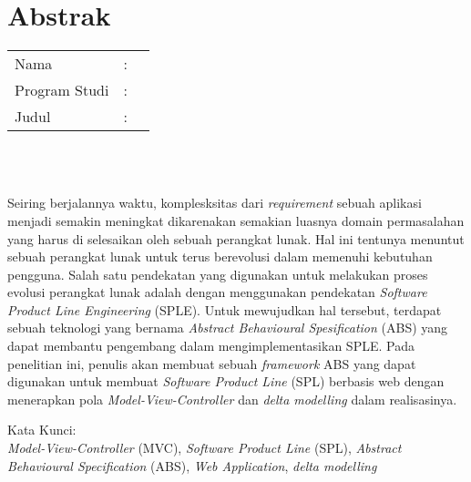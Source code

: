 %
%
%

\chapter*{Abstrak}

\vspace*{0.2cm}

\noindent \begin{tabular}{l l p{10cm}}
	Nama&: & \penulis \\
	Program Studi&: & \program \\
	Judul&: & \judul \\
\end{tabular} \\ 

\vspace*{0.5cm}

\noindent 
\\ Seiring berjalannya waktu, komplesksitas dari \textit{requirement} sebuah aplikasi menjadi semakin meningkat dikarenakan semakian luasnya domain permasalahan yang harus di selesaikan oleh sebuah perangkat lunak. Hal ini tentunya menuntut sebuah perangkat lunak untuk terus berevolusi dalam memenuhi kebutuhan pengguna. Salah satu pendekatan yang digunakan untuk melakukan proses evolusi perangkat lunak adalah dengan menggunakan pendekatan \textit{Software Product Line Engineering} (SPLE). Untuk mewujudkan hal tersebut, terdapat sebuah teknologi yang bernama \textit{Abstract Behavioural Spesification} (ABS) yang dapat membantu pengembang dalam mengimplementasikan SPLE. Pada penelitian ini, penulis akan membuat sebuah \textit{framework} ABS yang dapat digunakan untuk membuat \textit{Software Product Line} (SPL) berbasis web dengan menerapkan pola \textit{Model-View-Controller} dan \textit{delta modelling} dalam realisasinya.

\vspace*{0.2cm}

\noindent Kata Kunci: \\ 
\noindent \textit{Model-View-Controller} (MVC), \textit{Software Product Line} (SPL), \textit{Abstract Behavioural Specification} (ABS), \textit{Web Application}, \textit{delta modelling}\\

\newpage